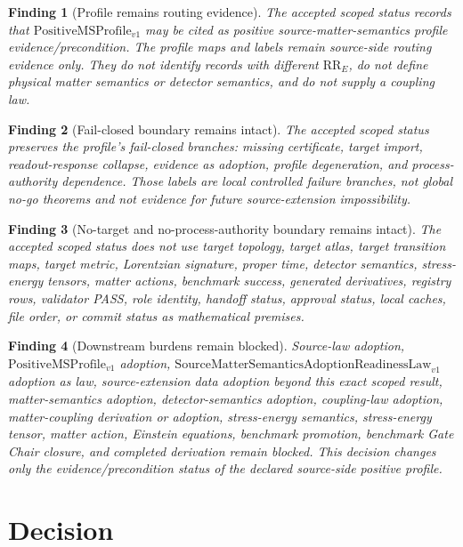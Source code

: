 \documentclass[11pt]{article}
\newcommand{\PositiveMSProfile}{\mathrm{PositiveMSProfile}_{v1}}
\newcommand{\SMSAR}{\mathrm{SourceMatterSemanticsAdoptionReadinessLaw}_{v1}}
\newtheorem{finding}{Finding}
\begin{document}
\begin{finding}[Profile remains routing evidence]
The accepted scoped status records that \(\PositiveMSProfile\) may be cited as
positive source-matter-semantics profile evidence/precondition. The profile
maps and labels remain source-side routing evidence only. They do not identify
records with different \(\mathrm{RR}_E\), do not define physical matter
semantics or detector semantics, and do not supply a coupling law.
\end{finding}

\begin{finding}[Fail-closed boundary remains intact]
The accepted scoped status preserves the profile's fail-closed branches:
missing certificate, target import, readout-response collapse, evidence as
adoption, profile degeneration, and process-authority dependence. Those labels
are local controlled failure branches, not global no-go theorems and not
evidence for future source-extension impossibility.
\end{finding}

\begin{finding}[No-target and no-process-authority boundary remains intact]
The accepted scoped status does not use target topology, target atlas, target
transition maps, target metric, Lorentzian signature, proper time, detector
semantics, stress-energy tensors, matter actions, benchmark success, generated
derivatives, registry rows, validator PASS, role identity, handoff status,
approval status, local caches, file order, or commit status as mathematical
premises.
\end{finding}

\begin{finding}[Downstream burdens remain blocked]
Source-law adoption, \(\PositiveMSProfile\) adoption,
\(\SMSAR\) adoption as law, source-extension data adoption beyond this exact
scoped result, matter-semantics adoption, detector-semantics adoption,
coupling-law adoption, matter-coupling derivation or adoption, stress-energy
semantics, stress-energy tensor, matter action, Einstein equations, benchmark
promotion, benchmark Gate Chair closure, and completed derivation remain
blocked. This decision changes only the evidence/precondition status of the
declared source-side positive profile.
\end{finding}

\section{Decision}
\end{document}
